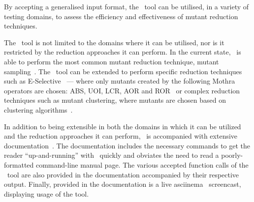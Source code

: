 


By accepting a generalised input format, the \mr~tool can be utilised, in a variety of testing domains, to assess the efficiency
and effectiveness of mutant reduction techniques.



The \mr~tool is not limited to the domains where it can be utilised, nor is it restricted by the reduction approaches it
can perform. In the current state, \mr~is able to perform the most common mutant reduction technique, mutant
sampling~\cite{gopinath2015mutation, jia2011analysis, gopinath2015empirical}.  The \mr~tool can be extended to perform
specific reduction techniques such as E-Selective~\cite{offutt1996experimental} --- where only mutants created by the
following Mothra operators are chosen: ABS, UOI, LCR, AOR and ROR~\cite{gopinath2015empirical} or complex reduction
techniques such as mutant clustering, where mutants are chosen based on clustering algorithms~\cite{jia2011analysis}.


In addition to being extensible in both the domains in which it can be utilized and the
reduction approaches it can perform, \mr~is accompanied with extensive documentation~\cite{tool}.
The documentation includes the necessary commands to get the reader ``up-and-running''
with \mr~quickly and obviates the need to read a poorly-formatted command-line manual page.
The various accepted function calls of the \mr~tool are also provided in the documentation
accompanied by their respective output. Finally, provided in the documentation is a live
asciinema~\cite{asciinema} screencast, displaying usage of the tool.


